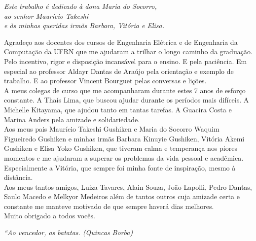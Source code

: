\documentclass[
	12pt,				%
	openright,			%
	twoside,			%
	a4paper,			%
	english,			%
	french,				%
	spanish,			%
	brazil				%
	]{abntex2}
\begin{document}
\begin{dedicatoria}
\thispagestyle{simple}
   \vspace*{\fill}
   \centering
   \noindent
   \textit{ Este trabalho é dedicado à dona Maria do Socorro,\\
   ao senhor Maurício Takeshi\\
   e às minhas queridas irmãs Barbara, Vitória e Elisa.} \vspace*{\fill}
\end{dedicatoria}

\begin{agradecimentos}
\thispagestyle{simple}
Agradeço aos docentes dos cursos de Engenharia Elétrica e de Engenharia da Computação da UFRN que me ajudaram a trilhar o longo caminho da graduação. Pelo incentivo, rigor e disposição incansável para o ensino. E pela paciência. Em especial ao professor Aldayr Dantas de Araújo pela orientação e exemplo de trabalho. E ao professor Vincent Bourguet pelas conversas e lições.\\

A meus colegas de curso que me acompanharam durante estes 7 anos de esforço constante. A Thaís Lima, que buscou ajudar durante os períodos mais difíceis. A Michelle Kitayama, que ajudou tanto em tantas tarefas. A Guacira Costa e Marina Anders pela amizade e solidariedade.\\
  
Aos meus pais Maurício Takeshi Gushiken e Maria do Socorro Waquim Figueiredo Gushiken e minhas irmãs Barbara Kinuyie Gushiken, Vitória Akemi Gushiken e Elisa Yoko Gushiken, que tiveram calma e temperança nos piores momentos e me ajudaram a superar os problemas da vida pessoal e acadêmica. Especialmente a Vitória, que sempre foi minha fonte de inspiração, mesmo à distância.\\

Aos meus tantos amigos, Luiza Tavares, Alain Souza, João Lapolli, Pedro Dantas, Saulo Macedo e Melkyor Medeiros além de tantos outros cuja amizade certa e constante me manteve motivado de que sempre haverá dias melhores.\\

Muito obrigado a todos vocês.   

\end{agradecimentos}

\begin{epigrafe}
\thispagestyle{simple}
    \vspace*{\fill}
	\begin{flushright}
		\textit{``Ao vencedor, as batatas.
		(Quincas Borba)}
	\end{flushright}
\end{epigrafe}
\end{document}
